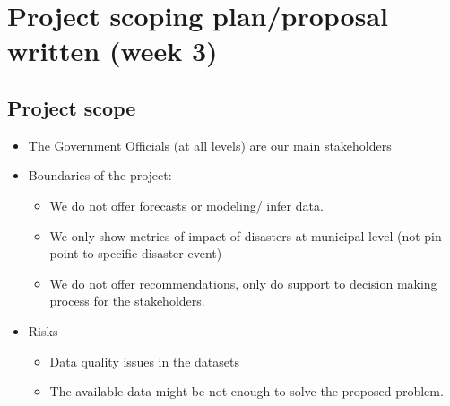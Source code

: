 \documentclass[11pt]{article}
\begin{document}






\section{Project scoping plan/proposal written (week 3)}
\label{sec:app}

\subsection{Project scope}

\begin{itemize}
\item The Government Officials (at all levels) are our main stakeholders
\item Boundaries of the project:
\begin{itemize}
\item We do not offer forecasts or modeling/ infer data.
\item We only show metrics of impact of disasters at municipal level (not pin point to specific disaster event)
\item We do not offer recommendations, only do support to decision making process for the stakeholders.
\end{itemize}
\item Risks
\begin{itemize}
\item Data quality issues in the datasets 
\item The available data might be not enough to solve the proposed problem.
\end{itemize}
\end{itemize}
\end{document}
